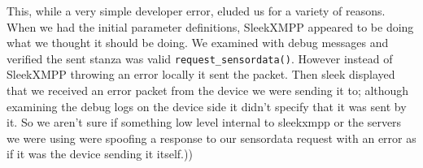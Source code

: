 This, while a very simple developer error, eluded us for a variety of reasons.
When we had the initial parameter definitions, SleekXMPP appeared to be doing
what we thought it should be doing. We examined with debug messages and verified
the sent stanza was valid \texttt{request\_sensordata()}. However instead of SleekXMPP
throwing an error locally it sent the packet. Then sleek displayed that we
received an error packet from the device we were sending it to; although
examining the debug logs on the device side it didn’t specify that it was sent
by it. So we aren’t sure if something low level internal to sleekxmpp or the
servers we were using were spoofing a response to our sensordata request with an
error as if it was the device sending it itself.))
